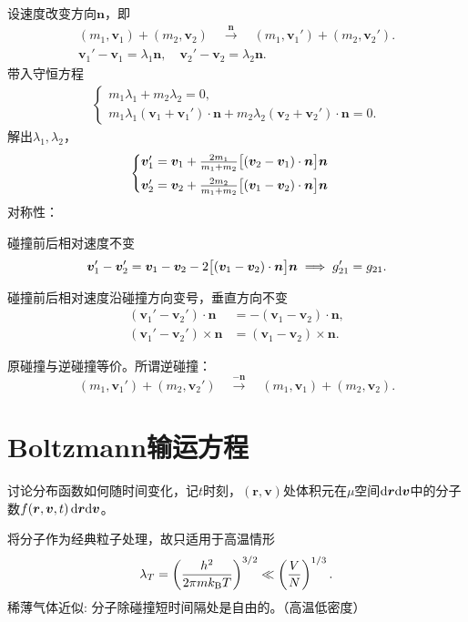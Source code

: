 设速度改变方向$\bm n$，即
\begin{gather*}
	(m_1,\bm v_1)+(m_2,\bm v_2)\quad\overset{\bm n}{\longrightarrow}\quad(m_1,\bm v_1')+(m_2,\bm v_2').\\
	\bm v_1'-\bm v_1=\lambda_1\bm n,\quad\bm v_2'-\bm v_2=\lambda_2\bm n.
\end{gather*}
带入守恒方程
\begin{align*}
	\begin{cases}
		m_1\lambda_1+m_2\lambda_2=0,\\
		m_1\lambda_1(\bm v_1+\bm v_1')\cdot\bm n+m_2\lambda_2(\bm v_2+\bm v_2')\cdot\bm n=0.
	\end{cases}
\end{align*}
解出$\lambda_1,\lambda_2$，
\begin{align}
	\begin{cases}
		\bm v_1'=\bm v_1+\frac{2m_1}{m_1+m_2}\bigl[(\bm v_2-\bm v_1)\cdot\bm n\bigr]\bm n\\[1ex]
		\bm v_2'=\bm v_2+\frac{2m_2}{m_1+m_2}\bigl[(\bm v_1-\bm v_2)\cdot\bm n\bigr]\bm n
	\end{cases}
\end{align}
对称性：
\begin{compactenum}
	\item 碰撞前后相对速度不变
	\[
		\bm v_1'-\bm v_2'=\bm v_1-\bm v_2-2\bigl[(\bm v_1-\bm v_2)\cdot\bm n\bigr]\bm n\implies g_{21}'=g_{21}.
	\]
	\item 碰撞前后相对速度沿碰撞方向变号，垂直方向不变
	\begin{align*}
		(\bm v_1'-\bm v_2')\cdot\bm n&=-(\bm v_1-\bm v_2)\cdot\bm n,\\
		(\bm v_1'-\bm v_2')\times\bm n&=(\bm v_1-\bm v_2)\times\bm n.
	\end{align*}
	\item 原碰撞与逆碰撞等价。所谓逆碰撞：
	\[
		(m_1,\bm v_1')+(m_2,\bm v_2')\quad\overset{-\bm n}{\longrightarrow}\quad(m_1,\bm v_1)+(m_2,\bm v_2).
	\]
\end{compactenum}
\section{Boltzmann输运方程}
讨论分布函数如何随时间变化，记$t$时刻，$(\bm r,\bm v)$处体积元在$\mu$空间$\mathop{}\!\mathrm{d}\bm r\mathrm{d}\bm v$中的分子数$f(\bm r,\bm v,t)\mathop{}\!\mathrm{d}\bm r\mathrm{d}\bm v$。

将分子作为经典粒子处理，故只适用于高温情形
\[
	\lambda_T=\left(\frac{h^2}{2\pi mk_{\mathrm B} T}\right)^{3/2}\ll\left(\frac VN\right)^{1/3}.
\]
稀薄气体近似: 分子除碰撞短时间隔处是自由的。（高温低密度）

